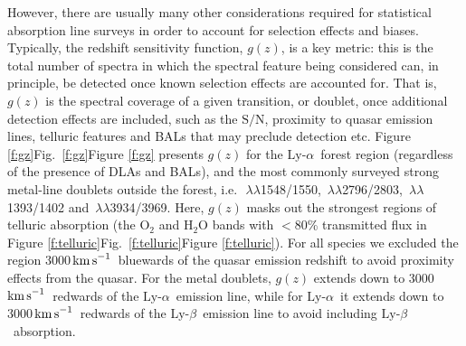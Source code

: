 \documentclass[fleqn,usenatbib,usedcolumn]{mnras}
\newcommand{\Fref}[1]{\ifhmode \ifnum\spacefactor=1001 Figure \ref{#1}\else Fig.\ \ref{#1}\fi \else Figure \ref{#1}\fi}
\newcommand{\kms}{\ensuremath{\textrm{km\,s}^{-1}}}
\newcommand{\SN}{\ensuremath{\textrm{S/N}}}
\newcommand{\lya}{\ensuremath{\textrm{Ly-}\alpha}}
\newcommand{\lyb}{\ensuremath{\textrm{Ly-}\beta}}
\begin{document}
However, there are usually many other considerations required for statistical absorption line surveys in order to account for selection effects and biases. Typically, the redshift sensitivity function, $g(z)$, is a key metric: this is the total number of spectra in which the spectral feature being considered can, in principle, be detected once known selection effects are accounted for. That is, $g(z)$ is the spectral coverage of a given transition, or doublet, once additional detection effects are included, such as the \SN, proximity to quasar emission lines, telluric features and BALs that may preclude detection etc. \Fref{f:gz} presents $g(z)$ for the \lya\ forest region (regardless of the presence of DLAs and BALs), and the most commonly surveyed strong metal-line doublets outside the forest, i.e.\ \,$\lambda\lambda$1548/1550, \,$\lambda\lambda$2796/2803, \,$\lambda\lambda$1393/1402 and \,$\lambda\lambda$3934/3969. Here, $g(z)$ masks out the strongest regions of telluric absorption (the O$_2$ and H$_2$O bands with $<$80\% transmitted flux in \Fref{f:telluric}). For all species we excluded the region 3000\,\kms\ bluewards of the quasar emission redshift to avoid proximity effects from the quasar. For the metal doublets, $g(z)$ extends down to 3000\,\kms\ redwards of the \lya\ emission line, while for \lya\ it extends down to 3000\,\kms\ redwards of the \lyb\ emission line to avoid including \lyb\ absorption.
\end{document}
